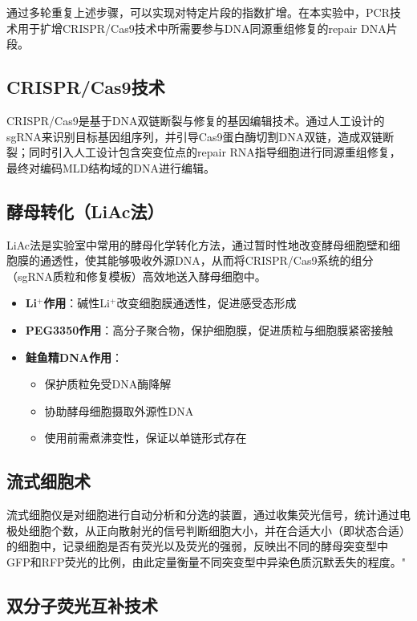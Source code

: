 \documentclass[a4,10pt]{article}
\begin{document}
通过多轮重复上述步骤，可以实现对特定片段的指数扩增。在本实验中，PCR技术用于扩增CRISPR/Cas9技术中所需要参与DNA同源重组修复的repair DNA片段。

\subsection{CRISPR/Cas9技术}

CRISPR/Cas9是基于DNA双链断裂与修复的基因编辑技术。通过人工设计的sgRNA来识别目标基因组序列，并引导Cas9蛋白酶切割DNA双链，造成双链断裂；同时引入人工设计包含突变位点的repair RNA指导细胞进行同源重组修复，最终对编码MLD结构域的DNA进行编辑。

\subsection{酵母转化（LiAc法）}

LiAc法是实验室中常用的酵母化学转化方法，通过暂时性地改变酵母细胞壁和细胞膜的通透性，使其能够吸收外源DNA，从而将CRISPR/Cas9系统的组分（sgRNA质粒和修复模板）高效地送入酵母细胞中。

\begin{itemize}
    \item \textbf{Li$^+$作用}：碱性Li$^+$改变细胞膜通透性，促进感受态形成
    \item \textbf{PEG3350作用}：高分子聚合物，保护细胞膜，促进质粒与细胞膜紧密接触
    \item \textbf{鲑鱼精DNA作用}：
    \begin{itemize}
        \item 保护质粒免受DNA酶降解
        \item 协助酵母细胞摄取外源性DNA
        \item 使用前需煮沸变性，保证以单链形式存在
    \end{itemize}
\end{itemize}

\subsection{流式细胞术}

流式细胞仪是对细胞进行自动分析和分选的装置，通过收集荧光信号，统计通过电极处细胞个数，从正向散射光的信号判断细胞大小，并在合适大小（即状态合适）的细胞中，记录细胞是否有荧光以及荧光的强弱，反映出不同的酵母突变型中GFP和RFP荧光的比例，由此定量衡量不同突变型中异染色质沉默丢失的程度。"

\subsection{双分子荧光互补技术}
\end{document}
